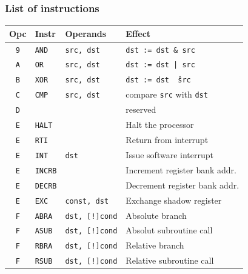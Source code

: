 \documentclass{beamer}
\begin{document}
   \begin{frame}
    \frametitle{List of instructions}
    \begin{center}
     \begin{tabular}{|c|ll|l|}
      \hline
       Opc&Instr&Operands&Effect\\
      \hline
       {\tt 9}&{\tt AND}&{\tt src, dst}&{\tt dst := dst \& src}\\
       {\tt A}&{\tt OR}&{\tt src, dst}&{\tt dst := dst | src}\\
       {\tt B}&{\tt XOR}&{\tt src, dst}&{\tt dst := dst \^\ src}\\
       {\tt C}&{\tt CMP}&{\tt src, dst}&compare {\tt src} with {\tt dst}\\ 
       {\tt D}&&&reserved\\
       {\tt E}&{\tt HALT}&&Halt the processor\\
       {\tt E}&{\tt RTI}&&Return from interrupt\\
       {\tt E}&{\tt INT}&\texttt{dst}&Issue software interrupt\\
       {\tt E}&{\tt INCRB}&&Increment register bank addr.\\
       {\tt E}&{\tt DECRB}&&Decrement register bank addr.\\
       {\tt E}&{\tt EXC}&{\tt const, dst}&Exchange shadow register\\
       {\tt F}&{\tt ABRA}&{\tt dst, [!]cond}&Absolute branch\\
       {\tt F}&{\tt ASUB}&{\tt dst, [!]cond}&Absolut subroutine call\\
       {\tt F}&{\tt RBRA}&{\tt dst, [!]cond}&Relative branch\\
       {\tt F}&{\tt RSUB}&{\tt dst, [!]cond}&Relative subroutine call\\
      \hline
     \end{tabular}
    \end{center}
   \end{frame}
%
\end{document}

